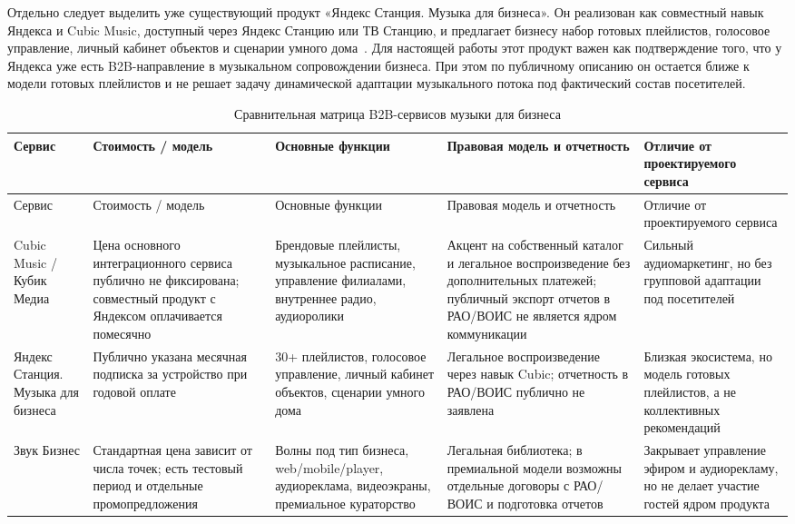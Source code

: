 Отдельно следует выделить уже существующий продукт «Яндекс Станция. Музыка для бизнеса». Он реализован как совместный навык Яндекса и Cubic Music, доступный через Яндекс Станцию или ТВ Станцию, и предлагает бизнесу набор готовых плейлистов, голосовое управление, личный кабинет объектов и сценарии умного дома~\cite{yandex_station_business}. Для настоящей работы этот продукт важен как подтверждение того, что у Яндекса уже есть B2B-направление в музыкальном сопровождении бизнеса. При этом по публичному описанию он остается ближе к модели готовых плейлистов и не решает задачу динамической адаптации музыкального потока под фактический состав посетителей.

\begingroup
\small
\singlespacing
\setlength{\tabcolsep}{3pt}
\begin{longtable}{p{}p{}p{}p{}p{}}
\caption{Сравнительная матрица B2B-сервисов музыки для бизнеса}
\label{tab:business-music-competitors}\\
\toprule
Сервис & Стоимость / модель & Основные функции & Правовая модель и отчетность & Отличие от проектируемого сервиса \\
\midrule
\endfirsthead
\toprule
Сервис & Стоимость / модель & Основные функции & Правовая модель и отчетность & Отличие от проектируемого сервиса \\
\midrule
\endhead
Cubic Music / Кубик Медиа & Цена основного интеграционного сервиса публично не фиксирована; совместный продукт с Яндексом оплачивается помесячно & Брендовые плейлисты, музыкальное расписание, управление филиалами, внутреннее радио, аудиоролики & Акцент на собственный каталог и легальное воспроизведение без дополнительных платежей; публичный экспорт отчетов в РАО/ВОИС не является ядром коммуникации & Сильный аудиомаркетинг, но без групповой адаптации под посетителей \\
\addlinespace
Яндекс Станция. Музыка для бизнеса & Публично указана месячная подписка за устройство при годовой оплате & 30+ плейлистов, голосовое управление, личный кабинет объектов, сценарии умного дома & Легальное воспроизведение через навык Cubic; отчетность в РАО/ВОИС публично не заявлена & Близкая экосистема, но модель готовых плейлистов, а не коллективных рекомендаций \\
\addlinespace
Звук Бизнес & Стандартная цена зависит от числа точек; есть тестовый период и отдельные промопредложения & Волны под тип бизнеса, web/mobile/player, аудиореклама, видеоэкраны, премиальное кураторство & Легальная библиотека; в премиальной модели возможны отдельные договоры с РАО/ВОИС и подготовка отчетов & Закрывает управление эфиром и аудиорекламу, но не делает участие гостей ядром продукта \\

\end{longtable}

